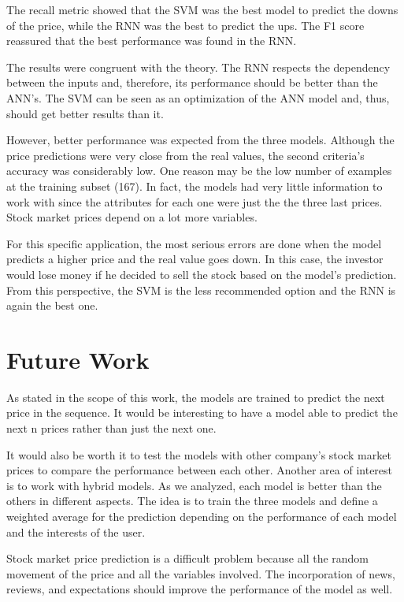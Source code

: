 The recall metric showed that the SVM was the best model to predict the downs of the price, while the RNN was the best to predict the ups. The F1 score reassured that the best performance was found in the RNN.

The results were congruent with the theory. The RNN respects the dependency between the inputs and, therefore, its performance should be better than the ANN's. The SVM can be seen as an optimization of the ANN model and, thus, should get better results than it. 

However, better performance was expected from the three models. Although the price predictions were very close from the real values, the second criteria's accuracy was considerably low. One reason may be the low number of examples at the training subset (167). In fact, the models had very little information to work with since the attributes for each one were just the the three last prices. Stock market prices depend on a lot more variables.

For this specific application, the most serious errors are done when the model predicts a higher price and the real value goes down. In this case, the investor would lose money if he decided to sell the stock based on the model's prediction. From this perspective, the SVM is the less recommended option and the RNN is again the best one. 

\section{Future Work}

As stated in the scope of this work, the models are trained to predict the next price in the sequence. It would be interesting to have a model able to predict the next n prices rather than just the next one.

It would also be worth it to test the models with other company's stock market prices to compare the performance between each other. Another area of interest is to work with hybrid models. As we analyzed, each model is better than the others in different aspects. The idea is to train the three models and define a weighted average for the prediction depending on the performance of each model and the interests of the user.

Stock market price prediction is a difficult problem because all the random movement of the price and all the variables involved. The incorporation of news, reviews, and expectations should improve the performance of the model as well. 

